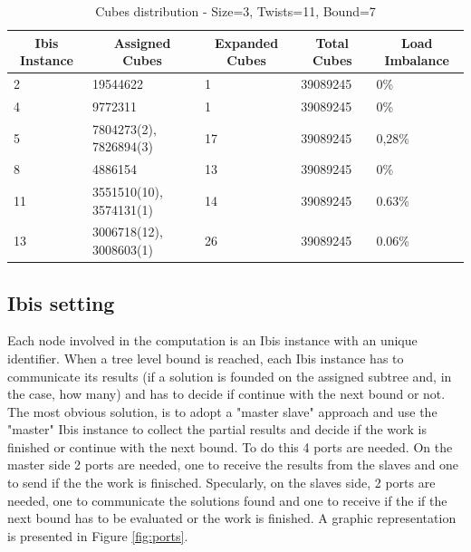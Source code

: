 \documentclass[a4paper]{article}
\begin{document}
\centering
\begin{table}[!ht]
\centering
\caption{Cubes distribution - Size=3, Twists=11, Bound=7}
\label{table:tlow}
\begin{tabular}{l|l|l|l|l}
\multicolumn{1}{c}{\bfseries Ibis Instance} & \multicolumn{1}{c}{\bfseries Assigned Cubes} & \multicolumn{1}{c}{\bfseries Expanded Cubes} & \multicolumn{1}{c}{\bfseries Total Cubes} & \multicolumn{1}{c}{\bfseries Load Imbalance} \\ \hline
2 & 19544622 & 1 & 39089245 & 0\%  \\ \hline
4 & 9772311 & 1 & 39089245 & 0\% \\ \hline
5 & 7804273(2), 7826894(3) & 17 & 39089245 & 0,28\% \\ \hline
8 & 4886154 & 13 & 39089245 & 0\% \\ \hline
11 & 3551510(10), 3574131(1) & 14 & 39089245 & 0.63\% \\ \hline
13 & 3006718(12), 3008603(1) & 26 & 39089245 & 0.06\%
\end{tabular}
\end{table}

\subsection{Ibis setting}
\label{sec:ibis_setting}
Each node involved in the computation is an Ibis instance with an unique identifier.
When a tree level bound is reached, each Ibis instance has to communicate its results (if a solution is founded on the assigned subtree and, in the case, how many) and has to decide if continue with the next bound or not. The most obvious solution, is to adopt a "master slave" approach and use the "master" Ibis instance to collect the partial results and decide if the work is finished or continue with the next bound. To do this 4 ports are needed. On the master side 2 ports are needed, one to receive the results from the slaves and one to send if the  the work is finisched. Specularly, on the slaves side, 2 ports are needed, one to communicate the solutions found and one to receive if the if the next bound has to be evaluated or the work is finished. A graphic representation is presented in Figure \ref{fig:ports}.
\end{document}
